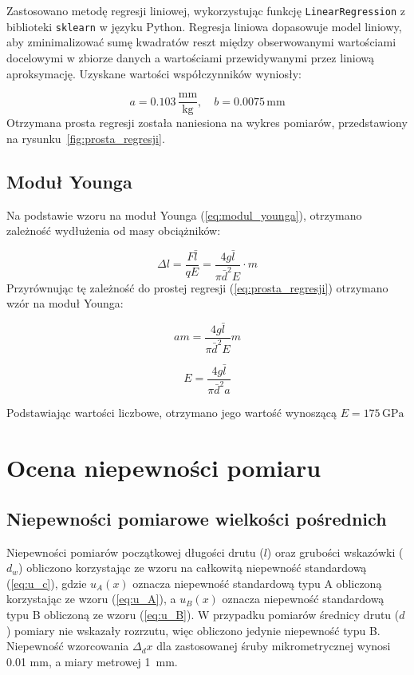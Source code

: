 \documentclass[a4paper,12pt]{article}
\begin{document}
Zastosowano metodę regresji liniowej, wykorzystując funkcję \texttt{LinearRegression} z biblioteki \texttt{sklearn} w języku Python.
Regresja liniowa dopasowuje model liniowy, aby zminimalizować sumę kwadratów reszt między obserwowanymi wartościami docelowymi w zbiorze danych a wartościami przewidywanymi przez liniową aproksymację.
Uzyskane wartości współczynników wyniosły:

\begin{equation}
a = 0.103\,\frac{\text{mm}}{\text{kg}}, \quad 
b = 0.0075\,\text{mm}
\end{equation}
Otrzymana prosta regresji została naniesiona na wykres pomiarów, przedstawiony na rysunku~\ref{fig:prosta_regresji}.

\subsection{Moduł Younga}

Na podstawie wzoru na moduł Younga (\ref{eq:modul_younga}), otrzymano zależność wydłużenia od masy obciążników:

\begin{equation}
\Delta l = \frac{F\bar{l}}{qE} = \frac{4g\bar{l}}{\pi\bar{d}^2 E}\cdot m
\end{equation}
Przyrównując tę zależność do prostej regresji (\ref{eq:prosta_regresji}) otrzymano wzór na moduł Younga:

$$
am = \frac{4g\bar{l}}{\pi\bar{d}^2 E}m
$$

$$
E = \frac{4g\bar{l}}{\pi\bar{d}^2 a}
$$

Podstawiając wartości liczbowe, otrzymano jego wartość wynoszącą $E = 175\,\text{GPa}$

\section{Ocena niepewności pomiaru}


\subsection{Niepewności pomiarowe wielkości pośrednich}

Niepewności pomiarów początkowej długości drutu ($l$) oraz  grubości wskazówki ($d_w$) obliczono korzystając ze wzoru na całkowitą niepewność standardową (\ref{eq:u_c}), gdzie $u_A(x)$ oznacza niepewność standardową typu A obliczoną korzystając ze wzoru (\ref{eq:u_A}), a $u_B(x)$ oznacza niepewność standardową typu B obliczoną ze wzoru (\ref{eq:u_B}).
W przypadku pomiarów średnicy drutu ($d$) pomiary nie wskazały rozrzutu, więc obliczono jedynie niepewność typu B.
Niepewność wzorcowania \( \Delta_d x \) dla zastosowanej śruby mikrometrycznej wynosi 0.01 mm, a miary metrowej 1~mm.
\end{document}
